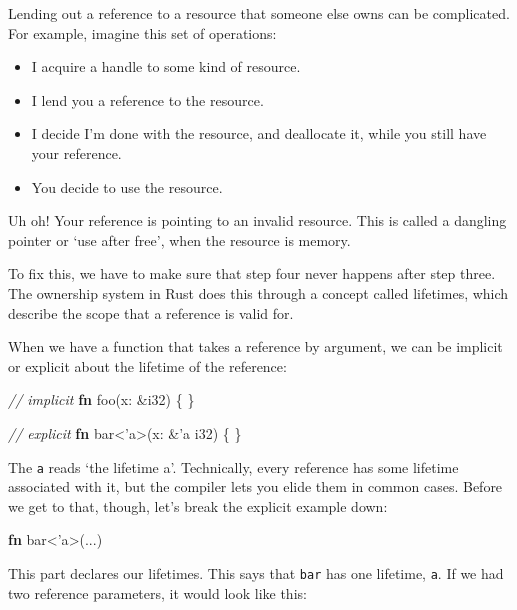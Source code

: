 \documentclass[a4paper,]{book}
\newenvironment{Shaded}{\begin{snugshade}}{\end{snugshade}}
\newcommand{\KeywordTok}[1]{\textcolor[rgb]{0.13,0.29,0.53}{\textbf{{#1}}}}
\newcommand{\DataTypeTok}[1]{\textcolor[rgb]{0.13,0.29,0.53}{{#1}}}
\newcommand{\CommentTok}[1]{\textcolor[rgb]{0.56,0.35,0.01}{\textit{{#1}}}}
\newcommand{\OtherTok}[1]{\textcolor[rgb]{0.56,0.35,0.01}{{#1}}}
\newcommand{\NormalTok}[1]{{#1}}
\providecommand{\tightlist}{%
  \setlength{\itemsep}{0pt}\setlength{\parskip}{0pt}}
\begin{document}
Lending out a reference to a resource that someone else owns can be
complicated. For example, imagine this set of operations:

\begin{itemize}
\tightlist
\item
  I acquire a handle to some kind of resource.
\item
  I lend you a reference to the resource.
\item
  I decide I'm done with the resource, and deallocate it, while you
  still have your reference.
\item
  You decide to use the resource.
\end{itemize}

Uh oh! Your reference is pointing to an invalid resource. This is called
a dangling pointer or `use after free', when the resource is memory.

To fix this, we have to make sure that step four never happens after
step three. The ownership system in Rust does this through a concept
called lifetimes, which describe the scope that a reference is valid
for.

When we have a function that takes a reference by argument, we can be
implicit or explicit about the lifetime of the reference:

\begin{Shaded}
\begin{Highlighting}[]
\CommentTok{// implicit}
\KeywordTok{fn} \NormalTok{foo(x: &}\DataTypeTok{i32}\NormalTok{) \{}
\NormalTok{\}}

\CommentTok{// explicit}
\KeywordTok{fn} \NormalTok{bar<}\OtherTok{'a}\NormalTok{>(x: &}\OtherTok{'a} \DataTypeTok{i32}\NormalTok{) \{}
\NormalTok{\}}
\end{Highlighting}
\end{Shaded}

The \texttt{\textquotesingle{}a} reads `the lifetime a'. Technically,
every reference has some lifetime associated with it, but the compiler
lets you elide them in common cases. Before we get to that, though,
let's break the explicit example down:

\begin{Shaded}
\begin{Highlighting}[]
\KeywordTok{fn} \NormalTok{bar<}\OtherTok{'a}\NormalTok{>(...)}
\end{Highlighting}
\end{Shaded}

This part declares our lifetimes. This says that \texttt{bar} has one
lifetime, \texttt{\textquotesingle{}a}. If we had two reference
parameters, it would look like this:
\end{document}
